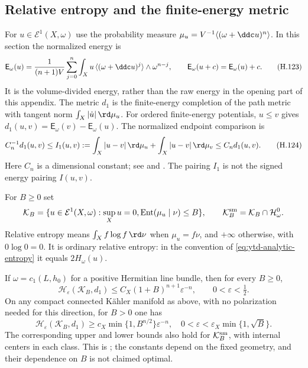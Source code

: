 \subsection{Relative entropy and the finite-energy metric}

For $u\in\mathcal E^1(X,\omega)$ use the probability measure
$\mu_u=V^{-1}\langle(\omega+\ddc u)^n\rangle$. In this section
the normalized energy is
\[
 \mathsf E_\omega(u)=\frac1{(n+1)V}\sum_{j=0}^n
  \int_Xu\,\langle(\omega+\ddc u)^j\rangle\wedge\omega^{n-j},
 \qquad \mathsf E_\omega(u+c)=\mathsf E_\omega(u)+c.
 \tag{H.123}\label{eq:appH-entropy-normalized-energy}
\]
It is the volume-divided energy, rather than the raw energy in the
opening part of this appendix. The metric $d_1$ is the finite-energy
completion of the path metric with tangent norm
$\int_X|\dot u|\,\rd\mu_u$. For ordered finite-energy potentials,
$u\leq v$ gives $d_1(u,v)=\mathsf E_\omega(v)-\mathsf E_\omega(u)$.
The normalized endpoint comparison is
\[
 C_n^{-1}d_1(u,v)\leq
 I_1(u,v):=\int_X|u-v|\,\rd\mu_u+\int_X|u-v|\,\rd\mu_v
 \leq C_n d_1(u,v).
 \tag{H.124}\label{eq:appH-entropy-endpoint-comparison}
\]
Here $C_n$ is a dimensional constant; see
\cite[Theorem~3]{Darvas14KahlerGeometryV2} and
\cite[\S2.2]{DLR18QuantizationV1}. The pairing $I_1$ is not the
signed energy pairing $I(u,v)$.

For $B\geq0$ set
\[
 \mathcal K_B=\{u\in\mathcal E^1(X,\omega):\sup_Xu=0,
                 \operatorname{Ent}(\mu_u\mid\nu)\leq B\},
 \qquad \mathcal K_B^{\rm sm}=\mathcal K_B\cap\mathcal H^0_\omega.
\]
Relative entropy means $\int_X f\log f\,\rd\nu$ when
$\mu_u=f\nu$, and $+\infty$ otherwise, with $0\log0=0$.
It is ordinary relative entropy: in the convention of
\eqref{eq:ytd-analytic-entropy} it equals $2H_\omega(u)$.

\begin{theorem}\label{thm:appH-finite-energy-metric-entropy}
If $\omega=c_1(L,h_0)$ for a positive Hermitian line bundle, then
for every $B\geq0$,
\[
 \mathscr H_\varepsilon(\mathcal K_B,d_1)
  \leq C_X(1+B)^{n+1}\varepsilon^{-n},
 \qquad 0<\varepsilon<\tfrac12.
 \tag{H.125}\label{eq:appH-finite-energy-entropy-upper}
\]
On any compact connected K\"ahler manifold as above, with no
polarization needed for this direction, for $B>0$ one has
\[
 \mathscr H_\varepsilon(\mathcal K_B,d_1)
 \geq c_X\min\{1,B^{n/2}\}\varepsilon^{-n},
 \quad 0<\varepsilon<\varepsilon_X\min\{1,\sqrt B\}.
 \tag{H.126}\label{eq:appH-finite-energy-entropy-lower}
\]
The corresponding upper and lower bounds also hold for
$\mathcal K_B^{\rm sm}$, with internal centers in each class.
This is \cite[Theorem~1.2]{Hisamoto26MetricEntropyV1}; the constants
depend on the fixed geometry, and their dependence on $B$ is not
claimed optimal.
\end{theorem}

